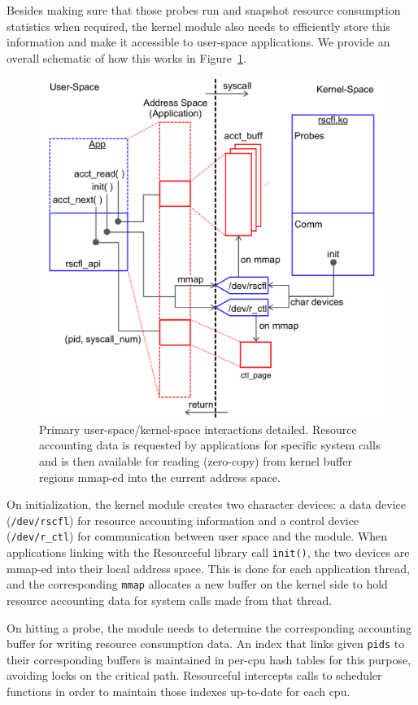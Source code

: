 \documentclass[12pt,twoside,a4paper]{article}
\newcommand{\pname}{Resourceful}
\begin{document}
Besides making sure that those probes run and snapshot resource consumption statistics
when required, the kernel module also needs to efficiently store this information
and make it accessible to user-space applications. We provide an overall schematic of
how this works in Figure~\ref{fig:design}.

\begin{figure}[ht!] 
	\centering
	\includegraphics[width=0.7\columnwidth,natwidth=1460,natheight=1440]{sys_design}
	\caption{Primary user-space/kernel-space interactions detailed. Resource
accounting data is requested by applications for specific system calls and is
then available for reading (zero-copy) from kernel buffer regions mmap-ed into
the current address space. } 
	\label{fig:design}
\end{figure}

On initialization, the kernel module creates two character devices: a data
device (\texttt{/dev/rscfl}) for resource accounting information and a control
device (\texttt{/dev/r\_ctl}) for communication between user space and the
module. When applications linking with the \pname{ }library call
\texttt{init()}, the two devices are mmap-ed into their local address space. This
is done for each application thread, and the corresponding \texttt{mmap}
allocates a new buffer on the kernel side to hold resource accounting data for
system calls made from that thread.

On hitting a probe, the module needs to determine the corresponding accounting
buffer for writing resource consumption data. An index that links given
\texttt{pids} to their corresponding buffers is maintained in per-cpu hash
tables for this purpose, avoiding locks on the critical path. \pname{ }
intercepts calls to scheduler functions in order to maintain those indexes
up-to-date for each cpu.
\end{document}
